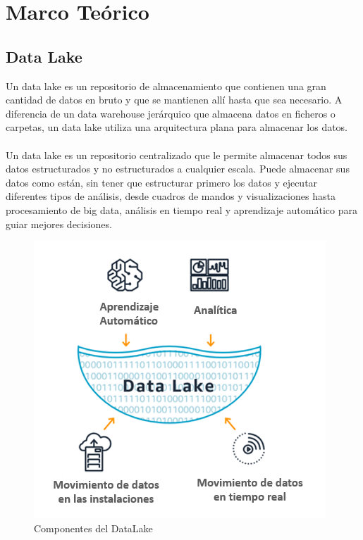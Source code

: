\documentclass[11pt,a4paper]{article}
\begin{document}
	\section{Marco Teórico}
	
		\subsection{Data Lake}
		
		Un data lake es un repositorio de almacenamiento que contienen una gran cantidad de datos en bruto y que se mantienen allí hasta que sea necesario. A diferencia de un data warehouse jerárquico que almacena datos en ficheros o carpetas, un data lake utiliza una arquitectura plana para almacenar los datos.\\
		\\
		Un data lake es un repositorio centralizado que le permite almacenar todos sus datos estructurados y no estructurados a cualquier escala. Puede almacenar sus datos como están, sin tener que estructurar primero los datos y ejecutar diferentes tipos de análisis, desde cuadros de mandos y visualizaciones hasta procesamiento de big data, análisis en tiempo real y aprendizaje automático para guiar mejores decisiones.
		
		\begin{figure}[H]
			\begin{center}
				\includegraphics[scale=0.6]{./Imagenes/img01}	
				\caption{Componentes del DataLake}		
			\end{center}
		\end{figure}
	
\end{document}

